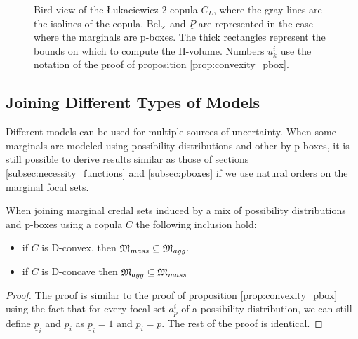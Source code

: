 \begin{figure}[!ht]
    \caption{Bird view of the \L ukaciewicz 2-copula $C_L$, where the gray lines are the isolines of the copula. $\mathrm{Bel}_\times$ and $\underline{P}$ are represented in the case where the marginals are p-boxes. The thick rectangles represent the bounds on which to compute the H-volume. Numbers $u^i_k$ use the notation of the proof of proposition \ref{prop:convexity_pbox}.}
    \label{fig:copula_convex}
\end{figure}

\subsection{Joining Different Types of Models}\label{subsec:multiple_models}
Different models can be used for multiple sources of uncertainty. When some marginals are modeled using possibility distributions and other by p-boxes, it is still possible to derive results similar as those of sections \ref{subsec:necessity_functions} and \ref{subsec:pboxes} if we use natural orders on the marginal focal sets. 
\begin{proposition}
    When joining marginal credal sets induced by a mix of possibility distributions and p-boxes using a copula $C$ the following inclusion hold:
    \begin{itemize}
        \item if $C$ is D-convex, then ${\mathfrak{M}}_{mass}\subseteq {\mathfrak{M}}_{agg}$.
        \item if $C$ is D-concave then ${\mathfrak{M}}_{agg}\subseteq{\mathfrak{M}}_{mass}$ 
    \end{itemize}
\end{proposition}

\begin{proof}
    The proof is similar to the proof of proposition \ref{prop:convexity_pbox} using the fact that for every focal set $a^i_p$ of a possibility distribution, we can still define $\underline{p}_i$ and $\overline{p}_i$ as $\underline{p}_i=1$ and $\overline{p}_i=p$. The rest of the proof is identical.
\end{proof}

